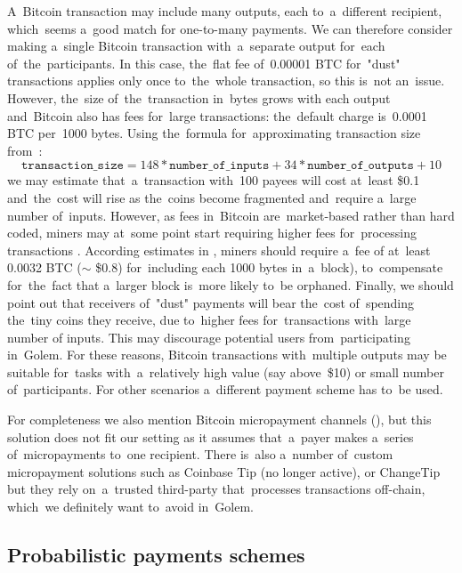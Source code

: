 \documentclass[a4paper]{article}
\newcommand{\BTC}{BTC}%
\begin{document}
    A~Bitcoin transaction may include many outputs, each to~a~different recipient, which~seems a~good match for
    one-to-many payments. We can therefore consider making a~single Bitcoin transaction with~a~separate output
    for~each of~the~participants. In this case, the~flat fee of~0.00001 \BTC{} for~"dust" transactions applies only
    once to~the~whole transaction, so this  is~not an~issue. However, the~size of~the~transaction in~bytes grows with
    each output and~Bitcoin also has fees for~large transactions: the~default charge  is~0.0001 \BTC{} per~1000 bytes.
    Using the~formula for~approximating transaction size from~\cite{BITFEE}:
    \begin{displaymath}
      \texttt{transaction\_size} = 148 * \texttt{number\_of\_inputs} + 34 * \texttt{number\_of\_outputs} + 10
    \end{displaymath}
    we may estimate that~a~transaction with~100 payees will cost at~least \$0.1 and~the~cost will rise as the~coins
    become fragmented and~require a~large number of~inputs. However, as fees in~Bitcoin are~market-based rather than
    hard coded, miners may at~some point start requiring higher fees for~processing transactions \cite{KASKALOGLU}.
    According estimates in \cite{ANDRESEN}, miners should require a~fee of
    at~least 0.0032 \BTC{} ($\sim$ \$0.8) for~including each 1000 bytes in~a~block), to~compensate for~the~fact that
    a~larger block  is~more likely to~be orphaned. Finally, we should point out that receivers of~"dust" payments will
    bear the~cost of~spending the~tiny coins they receive, due to~higher fees for~transactions with~large number of
    inputs. This may discourage potential users from~participating in~Golem. For these reasons, Bitcoin transactions
    with~multiple outputs may be suitable for~tasks with~a~relatively high value (say above~\$10) or small number
    of~participants. For other scenarios a~different payment scheme has to~be used.

    For completeness we also mention Bitcoin micropayment channels (\cite{BITCOINJ}), but this solution does not fit
    our setting as it assumes that~a~payer makes a~series of~micropayments to~one recipient.
    There  is~also a~number of~custom micropayment solutions such as Coinbase Tip \cite{COINTIP}(no longer active),
    or ChangeTip \cite{CHANGETIP} but they rely on~a~trusted third-party that~processes transactions off-chain,
    which~we definitely want to~avoid in~Golem.

\subsection{Probabilistic payments schemes}
\end{document}
